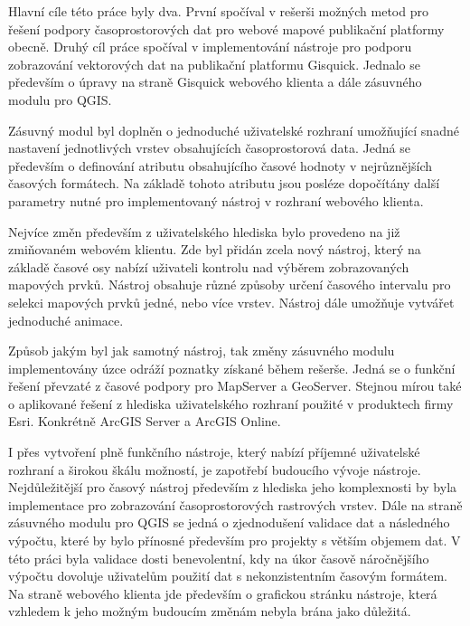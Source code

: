 \newpage
{}

Hlavní cíle této práce byly dva. První spočíval v rešerši možných
metod pro řešení podpory časoprostorových dat pro webové mapové
publikační platformy obecně. Druhý cíl práce spočíval v implementování
nástroje pro podporu zobrazování vektorových dat na publikační
platformu Gisquick. Jednalo se především o úpravy na straně Gisquick
webového klienta a dále zásuvného modulu pro QGIS.

Zásuvný modul byl doplněn o jednoduché uživatelské rozhraní umožňující
snadné nastavení jednotlivých vrstev obsahujících časoprostorová
data. Jedná se především o definování atributu obsahujícího časové
hodnoty v nejrůznějších časových formátech. Na základě tohoto atributu
jsou posléze dopočítány další parametry nutné pro implementovaný
nástroj v rozhraní webového klienta.

Nejvíce změn především z uživatelského hlediska bylo provedeno na již
zmiňovaném webovém klientu. Zde byl přidán zcela nový nástroj, který
na základě časové osy nabízí uživateli kontrolu nad výběrem
zobrazovaných mapových prvků. Nástroj obsahuje různé způsoby určení
časového intervalu pro selekci mapových prvků jedné, nebo více
vrstev. Nástroj dále umožňuje vytvářet jednoduché animace.

Způsob jakým byl jak samotný nástroj, tak změny zásuvného modulu
implementovány úzce odráží poznatky získané během rešerše. Jedná se o
funkční řešení převzaté z časové podpory pro MapServer a
GeoServer. Stejnou mírou také o aplikované řešení z hlediska
uživatelského rozhraní použité v produktech firmy Esri. Konkrétně
ArcGIS Server a ArcGIS Online.

I přes vytvoření plně funkčního nástroje, který nabízí příjemné
uživatelské rozhraní a širokou škálu možností, je zapotřebí budoucího
vývoje nástroje. Nejdůležitější pro časový nástroj především z
hlediska jeho komplexnosti by byla implementace pro zobrazování
časoprostorových rastrových vrstev. Dále na straně zásuvného modulu
pro QGIS se jedná o zjednodušení validace dat a následného výpočtu,
které by bylo přínosné především pro projekty s větším objemem dat. V
této práci byla validace dosti benevolentní, kdy na úkor časově
náročnějšího výpočtu dovoluje uživatelům použití dat s nekonzistentním
časovým formátem. Na straně webového klienta jde především o grafickou
stránku nástroje, která vzhledem k jeho možným budoucím změnám nebyla
brána jako důležitá.

